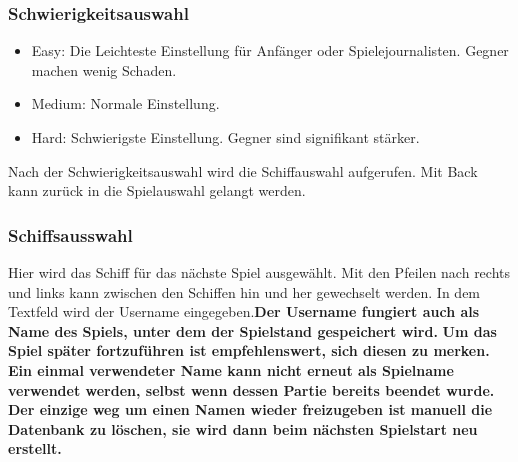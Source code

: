 \documentclass[fontsize=12pt,paper=a4,twoside]{scrartcl}
\begin{document}
\subsubsection{Schwierigkeitsauswahl}
\begin{itemize}
\item Easy: Die Leichteste Einstellung für Anfänger oder Spielejournalisten. Gegner machen wenig Schaden.
\item Medium: Normale Einstellung. 
\item Hard: Schwierigste Einstellung. Gegner sind signifikant stärker.
\end {itemize}
Nach der Schwierigkeitsauswahl wird die Schiffauswahl aufgerufen.
Mit Back kann zurück in die Spielauswahl gelangt werden. 

\subsubsection{Schiffsausswahl}
Hier wird das Schiff für das nächste Spiel ausgewählt.
Mit den Pfeilen nach rechts und links kann zwischen den Schiffen hin und her gewechselt werden.
In dem Textfeld wird der Username eingegeben.\textbf{Der Username fungiert auch als Name des Spiels, unter dem der Spielstand gespeichert wird.} \textbf{Um das Spiel später fortzuführen ist empfehlenswert, sich diesen zu merken. Ein einmal verwendeter Name kann nicht erneut als Spielname verwendet werden, selbst wenn dessen Partie bereits beendet wurde. Der einzige weg um einen Namen wieder freizugeben ist manuell die Datenbank zu löschen, sie wird dann beim nächsten Spielstart neu erstellt.}
\end{document}
